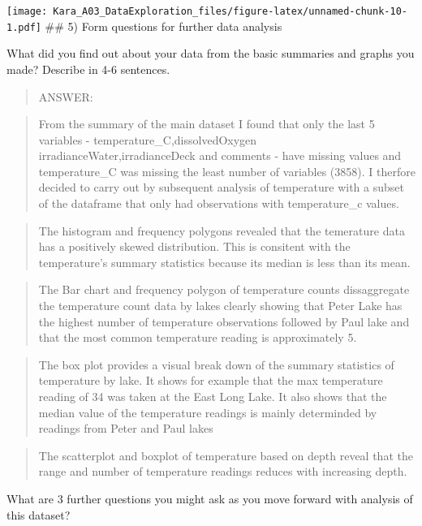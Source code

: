\documentclass[]{article}
\begin{document}
\texttt{[image: Kara\_A03\_DataExploration\_files/figure-latex/unnamed-chunk-10-1.pdf]}
\#\# 5) Form questions for further data analysis

What did you find out about your data from the basic summaries and
graphs you made? Describe in 4-6 sentences.

\begin{quote}
ANSWER:
\end{quote}

\begin{quote}
From the summary of the main dataset I found that only the last 5
variables - temperature\_C,dissolvedOxygen
irradianceWater,irradianceDeck and comments - have missing values and
temperature\_C was missing the least number of variables (3858). I
therfore decided to carry out by subsequent analysis of temperature with
a subset of the dataframe that only had observations with temperature\_c
values.
\end{quote}

\begin{quote}
The histogram and frequency polygons revealed that the temerature data
has a positively skewed distribution. This is consitent with the
temperature's summary statistics because its median is less than its
mean.
\end{quote}

\begin{quote}
The Bar chart and frequency polygon of temperature counts dissaggregate
the temperature count data by lakes clearly showing that Peter Lake has
the highest number of temperature observations followed by Paul lake and
that the most common temperature reading is approximately 5.
\end{quote}

\begin{quote}
The box plot provides a visual break down of the summary statistics of
temperature by lake. It shows for example that the max temperature
reading of 34 was taken at the East Long Lake. It also shows that the
median value of the temperature readings is mainly determinded by
readings from Peter and Paul lakes
\end{quote}

\begin{quote}
The scatterplot and boxplot of temperature based on depth reveal that
the range and number of temperature readings reduces with increasing
depth.
\end{quote}

What are 3 further questions you might ask as you move forward with
analysis of this dataset?
\end{document}
